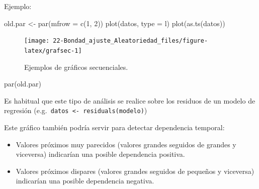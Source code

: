 \documentclass[
]{book}
\newenvironment{Shaded}{\begin{snugshade}}{\end{snugshade}}
\newcommand{\AttributeTok}[1]{\textcolor[rgb]{0.77,0.63,0.00}{#1}}
\newcommand{\DecValTok}[1]{\textcolor[rgb]{0.00,0.00,0.81}{#1}}
\newcommand{\FunctionTok}[1]{\textcolor[rgb]{0.00,0.00,0.00}{#1}}
\newcommand{\NormalTok}[1]{#1}
\newcommand{\OtherTok}[1]{\textcolor[rgb]{0.56,0.35,0.01}{#1}}
\newcommand{\StringTok}[1]{\textcolor[rgb]{0.31,0.60,0.02}{#1}}
\theoremstyle{break}
\theoremstyle{definition}
\theoremstyle{definition}
\theoremstyle{definition}
\theoremstyle{definition}
\theoremstyle{remark}
\begin{document}
Ejemplo:

\begin{Shaded}
\begin{Highlighting}[]
\NormalTok{old.par }\OtherTok{\textless{}{-}} \FunctionTok{par}\NormalTok{(}\AttributeTok{mfrow =} \FunctionTok{c}\NormalTok{(}\DecValTok{1}\NormalTok{, }\DecValTok{2}\NormalTok{))}
\FunctionTok{plot}\NormalTok{(datos, }\AttributeTok{type =} \StringTok{\textquotesingle{}l\textquotesingle{}}\NormalTok{)}
\FunctionTok{plot}\NormalTok{(}\FunctionTok{as.ts}\NormalTok{(datos))}
\end{Highlighting}
\end{Shaded}

\begin{figure}[!htb]

{\centering \texttt{[image: 22-Bondad\_ajuste\_Aleatoriedad\_files/figure-latex/grafsec-1]} 

}

\caption{Ejemplos de gráficos secuenciales.}\label{fig:grafsec}
\end{figure}

\begin{Shaded}
\begin{Highlighting}[]
\FunctionTok{par}\NormalTok{(old.par)}
\end{Highlighting}
\end{Shaded}

Es habitual que este tipo de análisis se realice sobre los residuos
de un modelo de regresión (e.g.~\texttt{datos\ \textless{}-\ residuals(modelo)})

Este gráfico también podría servir para detectar dependencia temporal:

\begin{itemize}
\item
  Valores próximos muy parecidos (valores grandes seguidos de grandes
  y viceversa) indicarían una posible dependencia positiva.
\item
  Valores próximos dispares (valores grandes seguidos de pequeños
  y viceversa) indicarían una posible dependencia negativa.
\end{itemize}
\end{document}
